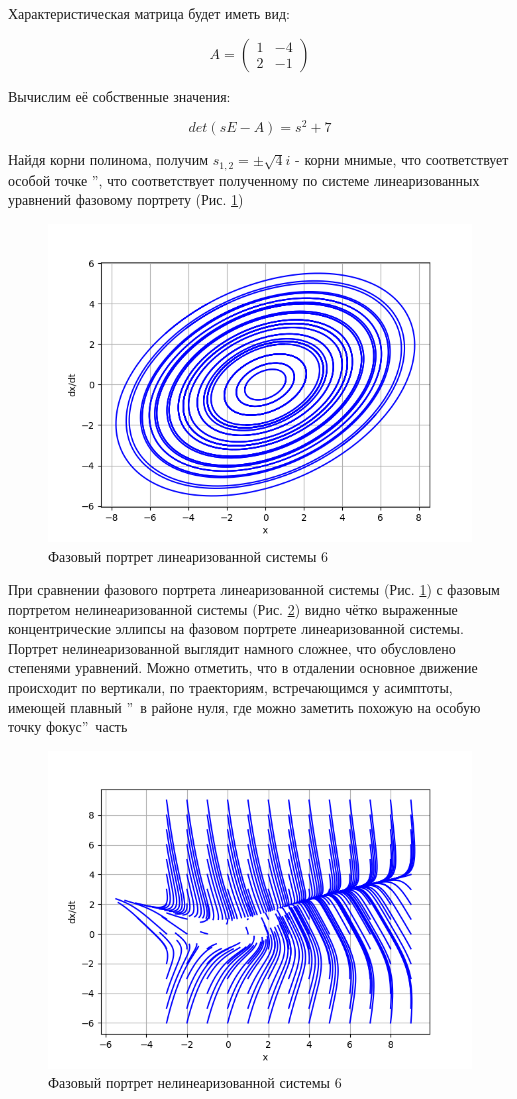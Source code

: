 Характеристическая матрица будет иметь вид:

$$
A = 
\begin{pmatrix}
	1 & -4 \\
	2 & -1
\end{pmatrix}
$$

Вычислим её собственные значения:

$$
det(sE - A) = s^2 + 7
$$

Найдя корни полинома, получим $s_{1,2} = \pm \sqrt{4}i$ - корни мнимые, 
что соответствует особой точке \textquotedblright, 
что соответствует полученному по системе линеаризованных уравнений фазовому портрету (Рис. \ref{fig:15})

\begin{figure}[H]
	\centering
	\includegraphics[width=0.6\linewidth]{body/images/Linearized-system-6.png}
	\caption{Фазовый портрет линеаризованной системы 6}
	\label{fig:15}
\end{figure}

При сравнении фазового портрета линеаризованной системы (Рис. \ref{fig:15}) с фазовым портретом нелинеаризованной системы
(Рис. \ref{fig:16}) видно чётко выраженные концентрические эллипсы на фазовом портрете линеаризованной системы.
Портрет нелинеаризованной выглядит намного сложнее, что обусловлено степенями уравнений. Можно отметить, что в отдалении 
основное движение происходит по вертикали, по траекториям, встречающимся у асимптоты, имеющей плавный \textquotedblright\ в районе нуля, 
где можно заметить похожую на особую точку  фокус\textquotedblright\ часть

\begin{figure}[H]
	\centering
	\includegraphics[width=0.6\linewidth]{body/images/System-6.png}
	\caption{Фазовый портрет нелинеаризованной системы 6}
	\label{fig:16}
\end{figure}

